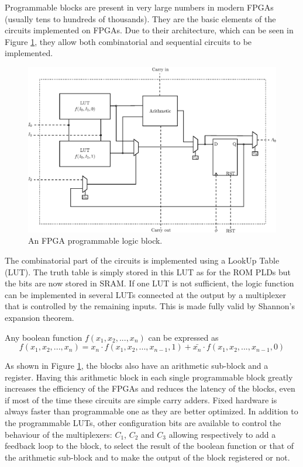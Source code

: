 Programmable blocks are present in very large numbers in modern FPGAs (usually tens to hundreds of 
thousands). They are the basic elements of the circuits implemented on FPGAs. Due to their 
architecture, which can be seen in Figure \ref{fig:fpga/fpga_block}, they allow both combinatorial 
and sequential circuits to be implemented. 

\begin{figure}[H]
    \centering
    \includegraphics[scale=0.8]{Chapter1-Hardware/res/fpga_block}
    \caption{An FPGA programmable logic block.}
    \label{fig:fpga/fpga_block}
\end{figure}

The combinatorial part of the circuits is implemented using a LookUp Table (LUT). The truth table is 
simply stored in this LUT as for the ROM PLDs but the bits are now stored in SRAM. If one LUT is 
not sufficient, the logic function can be implemented in several LUTs connected at the output by a 
multiplexer that is controlled by the remaining inputs. This is made fully valid by Shannon's 
expansion theorem. 

\begin{theorem}
    Any boolean function $f(x_1, x_2, ..., x_n)$ can be expressed as 
    \begin{equation*}
        f(x_1, x_2, ..., x_n) = x_n \cdot f(x_1, x_2, ..., x_{n - 1}, 1) + \bar{x_n} \cdot 
        f(x_1, x_2, ..., x_{n - 1}, 0)
    \end{equation*}
\end{theorem}

As shown in Figure \ref{fig:fpga/fpga_block}, the blocks also have an arithmetic sub-block and a 
register. Having this arithmetic block in each single programmable block greatly increases the 
efficiency of the FPGAs and reduces the latency of the blocks, even if most of the time these circuits are 
simple carry adders. Fixed hardware is always faster than programmable one as they are better 
optimized. In addition to the programmable LUTs, other configuration bits are available to control
the behaviour of the multiplexers: $C_1$, $C_2$ and $C_3$ allowing respectively to add a feedback 
loop to the block, to select the result of the boolean function or that of the arithmetic sub-block 
and to make the output of the block registered or not.

